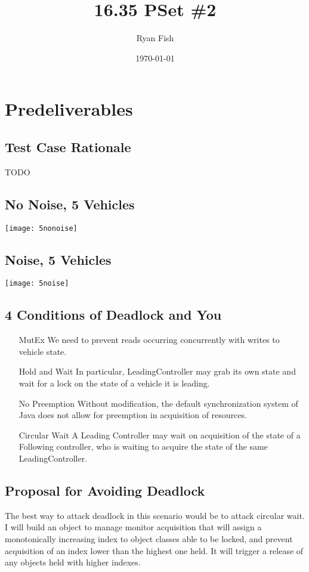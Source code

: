 \documentclass{article}
\title{16.35 PSet \#2}
\author{Ryan Fish}
\date{\today}
\begin{document}
\maketitle

\section{Predeliverables}
\subsection{Test Case Rationale}

TODO

\subsection{No Noise, 5 Vehicles}

\begin{center}
\texttt{[image: 5nonoise]}
\end{center}

\subsection{Noise, 5 Vehicles}

\begin{center}
\texttt{[image: 5noise]}
\end{center}


\subsection{4 Conditions of Deadlock and You}

\begin{enumerate}
	\item[MutEx] We need to prevent reads occurring concurrently with writes to vehicle state.
	\item[Hold and Wait] In particular, LeadingController may grab its own state and wait for a lock on the state of a vehicle it is leading.
	\item[No Preemption]  Without modification, the default synchronization system of Java does not allow for preemption in acquisition of resources.
	\item[Circular Wait]  A Leading Controller may wait on acquisition of the state of a Following controller, who is waiting to acquire the state of the same LeadingController.
\end{enumerate}
\subsection{Proposal for Avoiding Deadlock} 

The best way to attack deadlock in this scenario would be to attack circular wait.  I will build an object to manage monitor acquisition that will assign a monotonically increasing index to object classes able to be locked, and prevent acquisition of an index lower than the highest one held.  It will trigger a release of any objects held with higher indexes.
\end{document}
